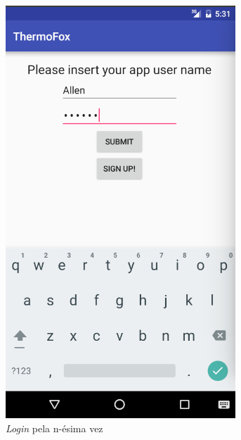 \documentclass[a4paper]{article}
\begin{document}
\begin{figure}[H]
  \includegraphics[width=\linewidth]{login2.png}
  \caption{\textit{Login} pela n-ésima vez}\label{fig:2}
\endminipage\hfill
{}

\end{figure}
\end{document}
